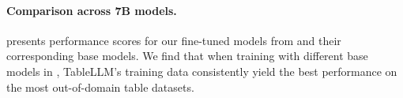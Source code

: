 \documentclass[11pt]{article}
\begin{document}
\paragraph{Comparison across 7B models.}
 presents performance scores for our fine-tuned models from  and their corresponding base models.
We find that when training with different base models in , TableLLM's training data consistently yield the best performance on the most out-of-domain table datasets.


\end{document}
